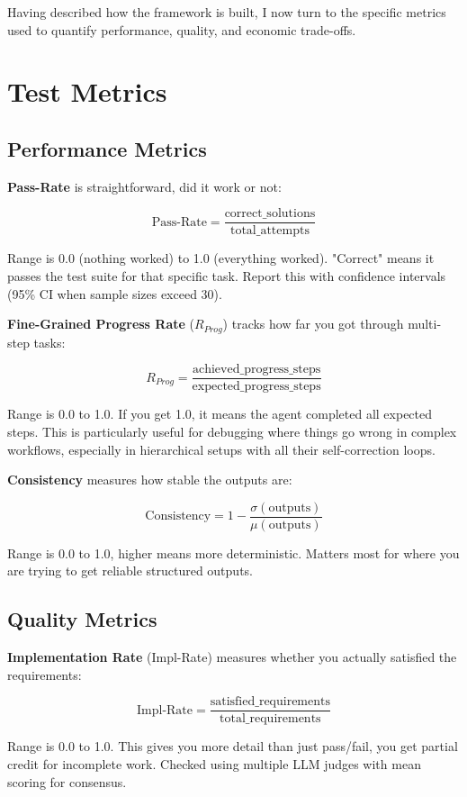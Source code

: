 \documentclass[11pt]{article}
\begin{document}
Having described how the framework is built, I now turn to the specific metrics used to quantify performance, quality, and economic trade-offs.

\section{Test Metrics}\label{sec:metrics}

\subsection{Performance Metrics}

\textbf{Pass-Rate} is straightforward, did it work or not:

$$\text{Pass-Rate} = \frac{\text{correct\_solutions}}{\text{total\_attempts}}$$

Range is 0.0 (nothing worked) to 1.0 (everything worked). "Correct" means it
passes the test suite for that specific task. Report this with confidence
 intervals (95\% CI when sample sizes exceed 30).

\textbf{Fine-Grained Progress Rate} ($R_{Prog}$) tracks how far you got through
 multi-step tasks:

$$R_{Prog} = \frac{\text{achieved\_progress\_steps}}{\text{expected\_progress\_steps}}$$

Range is 0.0 to 1.0. If you get 1.0, it means the agent completed all expected steps. This is particularly useful for debugging where things go wrong
in complex workflows, especially in hierarchical setups with all their
self-correction loops.

\textbf{Consistency} measures how stable the outputs are:

$$\text{Consistency} = 1 - \frac{\sigma(\text{outputs})}{\mu(\text{outputs})}$$

Range is 0.0 to 1.0, higher means more deterministic. Matters most for where
you are trying to get reliable structured outputs.

\subsection{Quality Metrics}

\textbf{Implementation Rate} (Impl-Rate) measures whether you actually satisfied the
requirements:

$$\text{Impl-Rate} = \frac{\text{satisfied\_requirements}}{\text{total\_requirements}}$$

Range is 0.0 to 1.0. This gives you more detail than just pass/fail, you get
partial credit for incomplete work. Checked using multiple LLM judges with
mean scoring for consensus.
\end{document}
